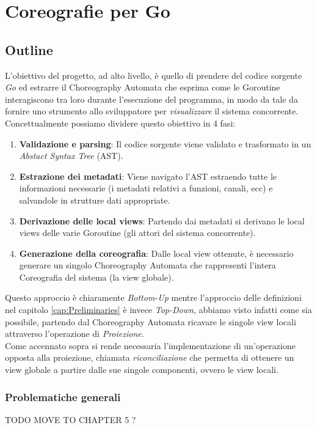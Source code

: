 \chapter{Coreografie per Go}
\section{Outline}
L'obiettivo del progetto, ad alto livello, è quello di prendere del codice sorgente \emph{Go} ed estrarre il Choreography Automata che esprima come le Goroutine interagiscono tra loro durante l'esecuzione del programma, in modo da tale da fornire uno strumento allo sviluppatore per \emph{visualizzare} il sistema concorrente.\\
Concettualmente possiamo dividere questo obiettivo in 4 fasi:
\begin{enumerate}
    \item \textbf{Validazione e parsing}: Il codice sorgente viene validato e trasformato in un \emph{Abstact Syntax Tree} (AST).
    \item \textbf{Estrazione dei metadati}: Viene navigato l'AST estraendo tutte le informazioni necessarie (i metadati relativi a funzioni, canali, ecc) e salvandole in strutture dati appropriate.
    \item \textbf{Derivazione delle local views}: Partendo dai metadati si derivano le local views delle varie Goroutine (gli attori del sistema concorrente).
    \item \textbf{Generazione della coreografia}: Dalle local view ottenute, è necessario generare un singolo Choreography Automata che rappresenti l'intera Coreografia del sistema (la view globale).
\end{enumerate}
Questo approccio è chiaramente \emph{Bottom-Up} mentre l'approccio delle definizioni nel capitolo \ref{cap:Preliminaries} è invece \emph{Top-Down}, abbiamo visto infatti come sia possibile, partendo dal Choreography Automata ricavare le singole view locali attraverso l'operazione di \emph{Proiezione}.\\
Come accennato sopra si rende necessaria l'implementazione di un'operazione opposta alla proiezione, chiamata \emph{riconciliazione} che permetta di ottenere un view globale a partire dalle sue singole componenti, ovvero le view locali.

\subsection{Problematiche generali}
TODO MOVE TO CHAPTER 5 ?

